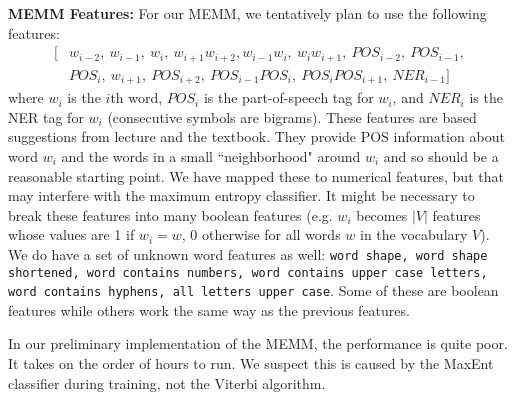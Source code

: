 \documentclass[12pt]{article}
\begin{document}
\textbf{MEMM Features:}
For our MEMM, we tentatively plan to use the following features:
\begin{equation*}
\begin{split}
[&w_{i - 2},\ w_{i - 1},\ w_i,\ w_{i + 1}w_{i + 2}, 
w_{i - 1}w_i,\ w_iw_{i + 1},\ POS_{i - 2},\ POS_{i - 1},\\ &POS_i,\ w_{i + 1},\ POS_{i + 2}, \ POS_{i - 1}POS_i,\ POS_iPOS_{i + 1},\ NER_{i - 1}]
\end{split}
\end{equation*}
where $w_i$ is the $i$th word, $POS_i$ is the part-of-speech tag for $w_i$, and $NER_i$ is the NER tag for $w_i$ (consecutive symbols are bigrams). These features are based suggestions from lecture and the textbook. They provide POS information about word $w_i$ and the words in a small ``neighborhood" around $w_i$ and so should be a reasonable starting point. We have mapped these to numerical features, but that may interfere with the maximum entropy classifier. It might be necessary to break these features into many boolean features (e.g. $w_i$ becomes $|V|$ features whose values are 1 if $w_i = w$, 0 otherwise for all words $w$ in the vocabulary $V$). We do have a set of unknown word features as well:
{\tt word shape, word shape shortened, word contains numbers, word contains upper case letters, word contains hyphens, all letters upper case}. Some of these are boolean features while others work the same way as the previous features. 

In our preliminary implementation of the MEMM, the performance is quite poor. It takes on the order of hours to run. We suspect this is caused by the MaxEnt classifier during training, not the Viterbi algorithm.
   
\end{document}
